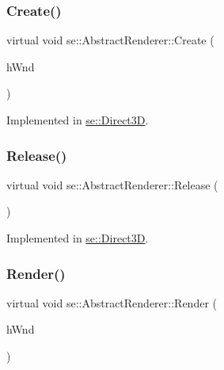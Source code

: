 \subsubsection{\texorpdfstring{Create()}{Create()}}
{\footnotesize\ttfamily virtual void se\+::\+Abstract\+Renderer\+::\+Create (\begin{DoxyParamCaption}\item[{H\+W\+ND}]{h\+Wnd }\end{DoxyParamCaption})\hspace{0.3cm}{\ttfamily [pure virtual]}}



Implemented in \mbox{\hyperlink{classse_1_1_direct3_d_a316456762829db0614077cccd655e654}{se\+::\+Direct3D}}.

\mbox{\label{classse_1_1_abstract_renderer_a98e35b7db62827580573185ed91b25bb}} 
\subsubsection{\texorpdfstring{Release()}{Release()}}
{\footnotesize\ttfamily virtual void se\+::\+Abstract\+Renderer\+::\+Release (\begin{DoxyParamCaption}{ }\end{DoxyParamCaption})\hspace{0.3cm}{\ttfamily [pure virtual]}}



Implemented in \mbox{\hyperlink{classse_1_1_direct3_d_ae2979f16a5c35773cf2c243d8e6f90e4}{se\+::\+Direct3D}}.

\mbox{\label{classse_1_1_abstract_renderer_acdc5f90b702a6c85c53d9b93334ae230}} 
\subsubsection{\texorpdfstring{Render()}{Render()}}
{\footnotesize\ttfamily virtual void se\+::\+Abstract\+Renderer\+::\+Render (\begin{DoxyParamCaption}\item[{H\+W\+ND}]{h\+Wnd }\end{DoxyParamCaption})\hspace{0.3cm}{\ttfamily [pure virtual]}}



